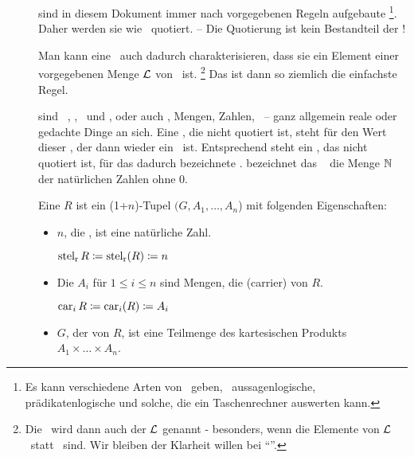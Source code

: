 \begin{description}
	\item [\Formeln] sind in diesem Dokument immer nach vorgegebenen Regeln aufgebaute \Zeichenfolgen%
	\footnote{%
		Es kann verschiedene Arten von \Formeln\ geben, \textzB\ aussagenlogische, prädikatenlogische und solche, die ein Taschenrechner auswerten kann.
	}.
	Daher werden sie wie \Zeichenfolgen\ quotiert.
	-- Die Quotierung ist kein Bestandteil der \Zeichenfolge!

	Man kann eine \Formel\ auch dadurch charakterisieren, dass sie ein Element einer vorgegebenen Menge $\mathcal{L}$ von \Zeichenfolgen\ ist.%
	\footnote{%
		Die \Formel\ wird dann auch  der  $\mathcal{L}$ genannt - besonders, wenn die Elemente von $\mathcal{L}$ \Zeichenketten\ statt \Zeichenfolgen\ sind.
		Wir bleiben der Klarheit willen bei \enquote{\Formel}.
	}
	Das ist dann so ziemlich die einfachste Regel.

	\item [\Objekte] sind \textzB\ \Symbole, \Zeichenketten, \Zeichenfolgen\ und \Formeln, oder auch \Aussagen, Mengen, Zahlen, \textusw\ -- ganz allgemein reale oder gedachte Dinge an sich.
	Eine \Formel, die nicht quotiert ist, steht für den Wert dieser \Formel, der dann wieder ein \Objekt\ ist.
	Entsprechend steht ein \Symbol, das nicht quotiert ist, für das dadurch bezeichnete \Objekt.
	\textZB bezeichnet das \Symbol\ \chrqt{$\gsN$} die Menge $\gsN$ der natürlichen Zahlen ohne 0.

	\item [\Relation] Eine  $R$ ist ein (1+$n$)-Tupel $(G,A_1,\dots,A_n$) mit folgenden Eigenschaften:
	\begin{itemize}
		\item $n$, die , ist eine natürliche Zahl.

		$\operatorname*{stel_r} R \coloneqq \operatorname*{stel_r}(R) \coloneqq n$
		\item Die $A_i$ für $1 \le i \le n$ sind Mengen, die  (carrier) von $R$.

		$\operatorname*{car}_i R \coloneqq \operatorname*{car}_i(R) \coloneqq A_i$
		\item $G$, der  von $R$, ist eine Teilmenge des kartesischen Produkts $A_1 \times \dots \times A_n$.


\end{itemize}
\end{description}
